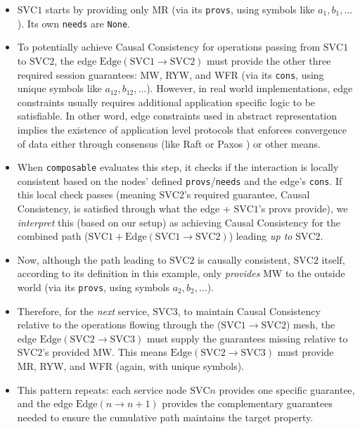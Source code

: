 \begin{itemize}
  \item $\text{SVC}1$ starts by providing only MR (via its
    \texttt{provs}, using symbols like $a_1, b_1, \ldots$).
    Its own \texttt{needs} are \texttt{None}.
  \item To potentially achieve Causal Consistency for operations
    passing from $\text{SVC}1$ to $\text{SVC}2$,
    the edge $\text{Edge}(\text{SVC1} \rightarrow \text{SVC2})$ must
    provide the other three required
    session guarantees: MW, RYW, and WFR (via its \texttt{cons},
    using unique symbols like $a_{12}, b_{12}, \ldots$).
    However, in real world implementations, edge constraints usually requires
    additional application specific logic to be satisfiable. In other word, edge
    constraints used in abstract representation implies the existence
    of application
    level protocols that enforces convergence of data either through
    consensus (like
    Raft \cite{diego2014raft} or Paxos \cite{lamport1998paxos}) or other means.
  \item When \texttt{composable} evaluates this step, it checks if
    the interaction is locally
    consistent based on the nodes' defined
    \texttt{provs}/\texttt{needs} and the edge's \texttt{cons}. If
    this local check passes (meaning $\text{SVC}2$'s required guarantee, Causal
      Consistency, is satisfied through what the edge + $\text{SVC}1$'s
    provs provide), we
    \textit{interpret} this (based on our setup) as achieving Causal
    Consistency for the
    combined path ($\text{SVC}1 + \text{Edge}(\text{SVC1} \rightarrow
    \text{SVC2})$) leading \textit{up to} $\text{SVC}2$.
  \item Now, although the path leading to $\text{SVC}2$ is causally
    consistent, $\text{SVC}2$ itself,
    according to its definition in this example, only
    \textit{provides} MW to the outside
    world (via its \texttt{provs}, using symbols $a_2, b_2, \ldots$).
  \item Therefore, for the \textit{next} service, $\text{SVC}3$, to
    maintain Causal Consistency
    relative to the operations flowing through the
    ($\text{SVC}1\rightarrow\text{SVC}2$) mesh, the edge
    $\text{Edge}(\text{SVC2} \rightarrow \text{SVC3})$ must
    supply the guarantees missing relative to $\text{SVC}2$'s
    provided MW. This means $\text{Edge}(\text{SVC2} \rightarrow
    \text{SVC3})$ must
    provide MR, RYW, and WFR (again, with unique symbols).
  \item This pattern repeats: each service node $\text{SVC}n$
    provides one specific
    guarantee, and the edge $\text{Edge}(n \rightarrow n+1)$ provides
    the complementary guarantees
    needed to ensure the cumulative path maintains the target property.
\end{itemize}

